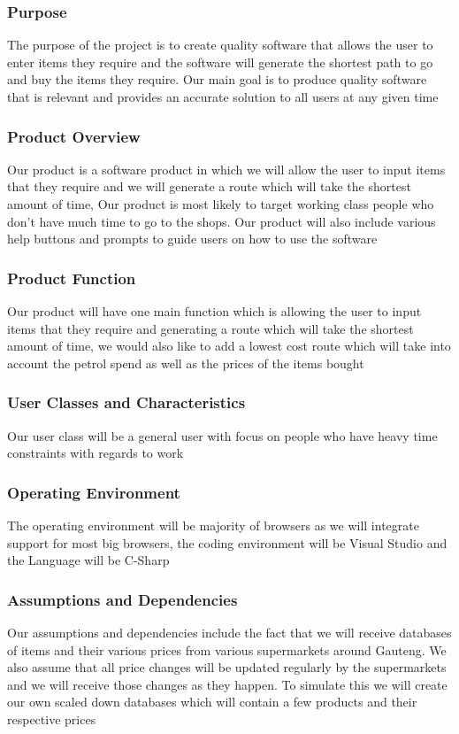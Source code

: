 \documentclass[12pt]{article}
\begin{document}
\subsubsection{Purpose}
The purpose of the project is to create quality software that allows 
the user to enter items they require and the software will generate the shortest
path to go and buy the items they require. Our main goal is to produce quality software
that is relevant and provides an accurate solution to all users at any given time

\subsubsection{Product Overview}
Our product is a software product in which we will allow the user to input 
items that they require and we will generate a route which will take the shortest amount
of time, Our product is most likely to target working class people who don't have much time 
to go to the shops. Our product will also include various help buttons and prompts to guide 
users on how to use the software 
\subsubsection{Product Function}
Our product will have one main function which is allowing the user to input 
items that they require and generating a route which will take the shortest amount
of time, we would also like to add a lowest cost route which will take into account 
the petrol spend as well as the prices of the items bought
\subsubsection{User Classes and Characteristics}
Our user class will be a general user with focus
on people who have heavy time constraints with regards to work
\subsubsection{Operating Environment}
The operating environment will be majority of browsers as we will 
integrate support for most big browsers, the coding environment will be Visual Studio and the
Language will be C-Sharp
\subsubsection{Assumptions and Dependencies}
Our assumptions and dependencies include the fact that we will
receive databases of items and their various prices from various supermarkets around Gauteng.
We also assume that all price changes will be updated regularly by the supermarkets and we will 
receive those changes as they happen. To simulate this we will create our own scaled down databases
which will contain a few products and their respective prices
\end{document}
